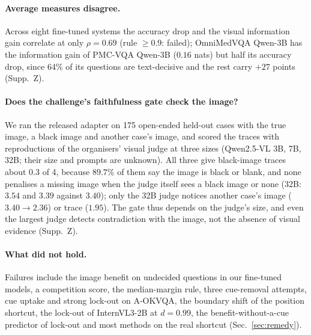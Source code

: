 \paragraph{Average measures disagree.}
Across eight fine-tuned systems the accuracy drop and the visual information gain correlate at only $\rho=0.69$ (rule $\ge0.9$: failed); OmniMedVQA Qwen-3B has the information gain of PMC-VQA Qwen-3B ($0.16$ nats) but half its accuracy drop, since 64\% of its questions are text-decisive and the rest carry $+27$ points (Supp.~Z).

\paragraph{Does the challenge's faithfulness gate check the image?}
We ran the released adapter on 175 open-ended held-out cases with the true image, a black image and another case's image, and scored the traces with reproductions of the organisers' visual judge at three sizes (Qwen2.5-VL 3B, 7B, 32B; their size and prompts are unknown).
All three give black-image traces about $0.3$ of 4, because $89.7\%$ of them say the image is black or blank, and none penalises a missing image when the judge itself sees a black image or none (32B: $3.54$ and $3.39$ against $3.40$); only the 32B judge notices another case's image ($3.40\to2.36$) or trace ($1.95$).
The gate thus depends on the judge's size, and even the largest judge detects contradiction with the image, not the absence of visual evidence (Supp.~Z).

\paragraph{What did not hold.}
Failures include the image benefit on undecided questions in our fine-tuned models, a competition score, the median-margin rule, three cue-removal attempts, cue uptake and strong lock-out on A-OKVQA, the boundary shift of the position shortcut, the lock-out of InternVL3-2B at $d=0.99$, the benefit-without-a-cue predictor of lock-out and most methods on the real shortcut (Sec.~\ref{sec:remedy}).
